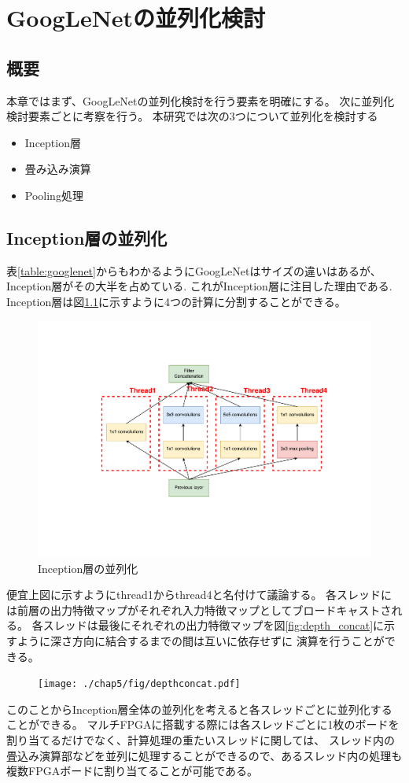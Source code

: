 \chapter{GoogLeNetの並列化検討}
{
\label{chap:parallel}

\section{概要}
本章ではまず、GoogLeNetの並列化検討を行う要素を明確にする。
次に並列化検討要素ごとに考察を行う。
本研究では次の3つについて並列化を検討する
\begin{itemize}
   \item Inception層 
   \item 畳み込み演算 
   \item Pooling処理 
\end{itemize}
\section{Inception層の並列化}
\label{sec:inception_para}
表\ref{table:googlenet}からもわかるようにGoogLeNetはサイズの違いはあるが、Inception層がその大半を占めている.
これがInception層に注目した理由である.
Inception層は図\ref{fig:para_inception}に示すように4つの計算に分割することができる。
\begin{figure}[h]
  \centering
  \includegraphics[width=12cm]{./chap5/fig/para_inception.pdf}
  \caption{Inception層の並列化}
  \label{fig:para_inception}
\end{figure}
便宜上図に示すようにthread1からthread4と名付けて議論する。
各スレッドには前層の出力特徴マップがそれぞれ入力特徴マップとしてブロードキャストされる。
各スレッドは最後にそれぞれの出力特徴マップを図\ref{fig:depth_concat}に示すように深さ方向に結合するまでの間は互いに依存せずに
演算を行うことができる。
\begin{figure}[h]
  \centering
  \texttt{[image: ./chap5/fig/depthconcat.pdf]}
  \caption{}
  \label{fig:depthconcat}
\end{figure}
このことからInception層全体の並列化を考えると各スレッドごとに並列化することができる。
マルチFPGAに搭載する際には各スレッドごとに1枚のボードを割り当てるだけでなく、計算処理の重たいスレッドに関しては、
スレッド内の畳込み演算部などを並列に処理することができるので、あるスレッド内の処理も複数FPGAボードに割り当てることが可能である。

}
